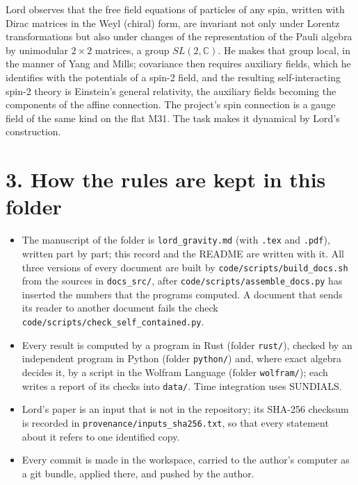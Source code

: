\documentclass[
  10pt,
]{article}
\providecommand{\tightlist}{%
  \setlength{\itemsep}{0pt}\setlength{\parskip}{0pt}}
\begin{document}
Lord observes that the free field equations of particles of any spin,
written with Dirac matrices in the Weyl (chiral) form, are invariant not
only under Lorentz transformations but also under changes of the
representation of the Pauli algebra by unimodular \(2\times2\) matrices,
a group \(SL(2,\mathbb C)\). He makes that group local, in the manner of
Yang and Mills; covariance then requires auxiliary fields, which he
identifies with the potentials of a spin-2 field, and the resulting
self-interacting spin-2 theory is Einstein's general relativity, the
auxiliary fields becoming the components of the affine connection. The
project's spin connection is a gauge field of the same kind on the flat
M31. The task makes it dynamical by Lord's construction.

\hypertarget{how-the-rules-are-kept-in-this-folder}{%
\section{3. How the rules are kept in this
folder}\label{how-the-rules-are-kept-in-this-folder}}

\begin{itemize}
\tightlist
\item
  The manuscript of the folder is \texttt{lord\_gravity.md} (with
  \texttt{.tex} and \texttt{.pdf}), written part by part; this record
  and the README are written with it. All three versions of every
  document are built by \texttt{code/scripts/build\_docs.sh} from the
  sources in \texttt{docs\_src/}, after
  \texttt{code/scripts/assemble\_docs.py} has inserted the numbers that
  the programs computed. A document that sends its reader to another
  document fails the check
  \texttt{code/scripts/check\_self\_contained.py}.
\item
  Every result is computed by a program in Rust (folder \texttt{rust/}),
  checked by an independent program in Python (folder \texttt{python/})
  and, where exact algebra decides it, by a script in the Wolfram
  Language (folder \texttt{wolfram/}); each writes a report of its
  checks into \texttt{data/}. Time integration uses SUNDIALS.
\item
  Lord's paper is an input that is not in the repository; its SHA-256
  checksum is recorded in \texttt{provenance/inputs\_sha256.txt}, so
  that every statement about it refers to one identified copy.
\item
  Every commit is made in the workspace, carried to the author's
  computer as a git bundle, applied there, and pushed by the author.
\end{itemize}
\end{document}
